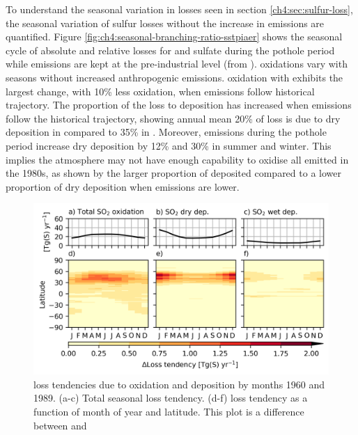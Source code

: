 To understand the seasonal variation in  losses seen in section \ref{ch4:sec:sulfur-loss}, the seasonal variation of sulfur losses without the increase in  emissions are quantified. Figure \ref{fig:ch4:seasonal-branching-ratio-sstpiaer} shows the seasonal cycle of absolute and relative losses for  and sulfate during the pothole period while  emissions are kept at the pre-industrial level (from \sstpiaer{}).  oxidations vary with seasons without increased anthropogenic  emissions.  oxidation with  exhibits the largest change, with 10\% less oxidation, when  emissions follow historical trajectory. The proportion of the loss to deposition has increased when  emissions follow the historical trajectory, showing annual mean 20\% of loss is due to dry deposition in \sstpiaer{} compared to 35\% in \histsst{}. Moreover,  emissions during the pothole period increase  dry deposition by 12\% and 30\% in summer and winter. This implies the atmosphere may not have enough capability to oxidise all  emitted in the 1980s, as shown by the larger proportion of  deposited compared to a lower proportion of dry deposition when  emissions are lower.

\begin{figure}
    \centering
    \includegraphics{Chapter4/Figs/so2_losses_histsst_pothole.png}
    \caption[ loss tendencies due to oxidation and deposition by months between 1960 and 1989 due to aerosol precursor emissions]{ loss tendencies due to oxidation and deposition by months 1960 and 1989. (a-c) Total seasonal  loss tendency. (d-f)  loss tendency as a function of month of year and latitude. This plot is a difference between \histsst{} and \sstpiaer}
    \label{fig:ch4:so2-loss}
\end{figure}


